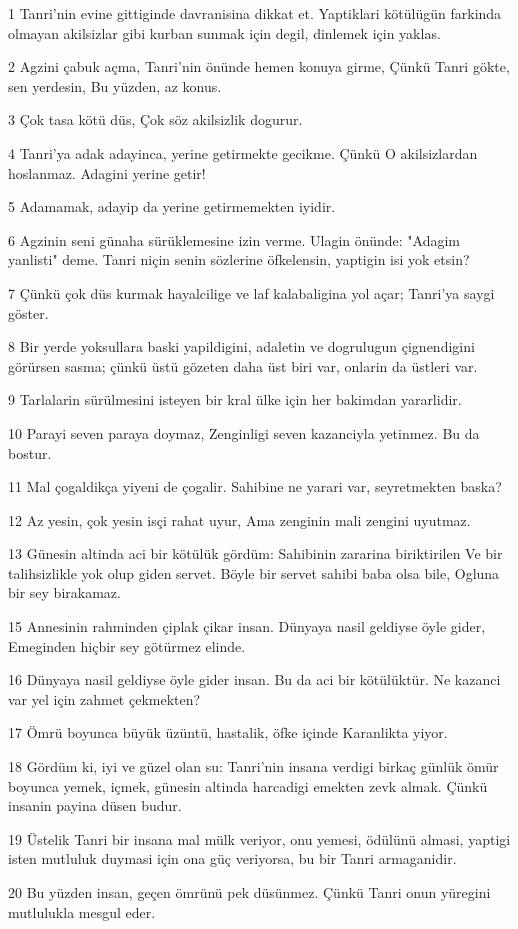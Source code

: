 \par 1 Tanri'nin evine gittiginde davranisina dikkat et. Yaptiklari kötülügün farkinda olmayan akilsizlar gibi kurban sunmak için degil, dinlemek için yaklas.
\par 2 Agzini çabuk açma, Tanri'nin önünde hemen konuya girme, Çünkü Tanri gökte, sen yerdesin, Bu yüzden, az konus.
\par 3 Çok tasa kötü düs, Çok söz akilsizlik dogurur.
\par 4 Tanri'ya adak adayinca, yerine getirmekte gecikme. Çünkü O akilsizlardan hoslanmaz. Adagini yerine getir!
\par 5 Adamamak, adayip da yerine getirmemekten iyidir.
\par 6 Agzinin seni günaha sürüklemesine izin verme. Ulagin önünde: "Adagim yanlisti" deme. Tanri niçin senin sözlerine öfkelensin, yaptigin isi yok etsin?
\par 7 Çünkü çok düs kurmak hayalcilige ve laf kalabaligina yol açar; Tanri'ya saygi göster.
\par 8 Bir yerde yoksullara baski yapildigini, adaletin ve dogrulugun çignendigini görürsen sasma; çünkü üstü gözeten daha üst biri var, onlarin da üstleri var.
\par 9 Tarlalarin sürülmesini isteyen bir kral ülke için her bakimdan yararlidir.
\par 10 Parayi seven paraya doymaz, Zenginligi seven kazanciyla yetinmez. Bu da bostur.
\par 11 Mal çogaldikça yiyeni de çogalir. Sahibine ne yarari var, seyretmekten baska?
\par 12 Az yesin, çok yesin isçi rahat uyur, Ama zenginin mali zengini uyutmaz.
\par 13 Günesin altinda aci bir kötülük gördüm: Sahibinin zararina biriktirilen Ve bir talihsizlikle yok olup giden servet. Böyle bir servet sahibi baba olsa bile, Ogluna bir sey birakamaz.
\par 15 Annesinin rahminden çiplak çikar insan. Dünyaya nasil geldiyse öyle gider, Emeginden hiçbir sey götürmez elinde.
\par 16 Dünyaya nasil geldiyse öyle gider insan. Bu da aci bir kötülüktür. Ne kazanci var yel için zahmet çekmekten?
\par 17 Ömrü boyunca büyük üzüntü, hastalik, öfke içinde Karanlikta yiyor.
\par 18 Gördüm ki, iyi ve güzel olan su: Tanri'nin insana verdigi birkaç günlük ömür boyunca yemek, içmek, günesin altinda harcadigi emekten zevk almak. Çünkü insanin payina düsen budur.
\par 19 Üstelik Tanri bir insana mal mülk veriyor, onu yemesi, ödülünü almasi, yaptigi isten mutluluk duymasi için ona güç veriyorsa, bu bir Tanri armaganidir.
\par 20 Bu yüzden insan, geçen ömrünü pek düsünmez. Çünkü Tanri onun yüregini mutlulukla mesgul eder.

